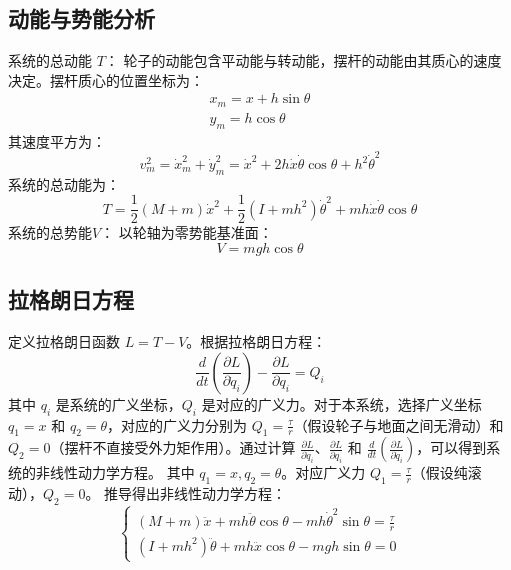 \documentclass[
  oneside,
  degree=bachelor,
  fullwidthstop=false,
  fontset=fandol,
  times=false,
  minted=true,
  biblatex=true,
]{tongjithesis}
\begin{document}
\subsection{动能与势能分析}
系统的总动能 $T$：
轮子的动能包含平动能与转动能，摆杆的动能由其质心的速度决定。摆杆质心的位置坐标为：
\begin{equation}
  \begin{aligned}
    x_m = x + h\sin\theta \\
    y_m = h\cos\theta
  \end{aligned}
\end{equation}
其速度平方为：
\begin{equation}
v_m^2 = \dot{x}_m^2 + \dot{y}_m^2 = \dot{x}^2 + 2h\dot{x}\dot{\theta}\cos\theta + h^2\dot{\theta}^2
\end{equation}
系统的总动能为：
\begin{equation}
T = \frac{1}{2}(M+m)\dot{x}^2 + \frac{1}{2}(I + mh^2)\dot{\theta}^2 + mh\dot{x}\dot{\theta}\cos\theta
\end{equation}
系统的总势能$V$：
以轮轴为零势能基准面：
\begin{equation}
V = mgh\cos\theta
\end{equation}

\subsection{拉格朗日方程}
定义拉格朗日函数 $L = T - V$。根据拉格朗日方程：
\begin{equation}
\frac{d}{dt}\left(\frac{\partial L}{\partial \dot{q}_i}\right) - \frac{\partial L}{\partial q_i} = Q_i
\end{equation}
其中 $q_i$ 是系统的广义坐标，$Q_i$ 是对应的广义力。对于本系统，选择广义坐标 $q_1 = x$ 和 $q_2 = \theta$，对应的广义力分别为 $Q_1 = \frac{\tau}{r}$（假设轮子与地面之间无滑动）和 $Q_2 = 0$（摆杆不直接受外力矩作用）。通过计算 $\frac{\partial L}{\partial \dot{q}_i}$、$\frac{\partial L}{\partial q_i}$ 和 $\frac{d}{dt}\left(\frac{\partial L}{\partial \dot{q}_i}\right)$，可以得到系统的非线性动力学方程。
其中 $q_1 = x, q_2 = \theta$。对应广义力 $Q_1 = \frac{\tau}{r}$（假设纯滚动），$Q_2 = 0$。
推导得出非线性动力学方程：
\begin{equation}
\begin{cases}
(M + m)\ddot{x} + mh\ddot{\theta}\cos\theta - mh\dot{\theta}^2\sin\theta = \frac{\tau}{r} \\
(I + mh^2)\ddot{\theta} + mh\ddot{x}\cos\theta - mgh\sin\theta = 0
\end{cases}
\end{equation}
\end{document}
